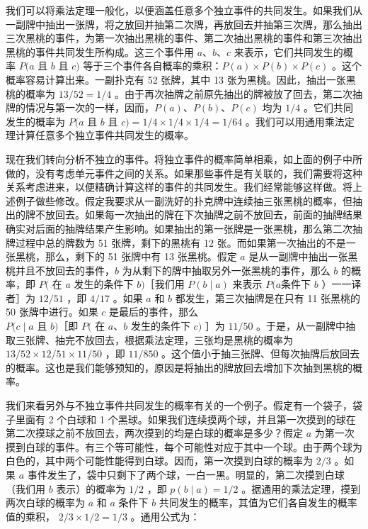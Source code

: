 我们可以将乘法定理一般化，以便涵盖任意多个独立事件的共同发生。如果我们从一副牌中抽出一张牌，将之放回并抽第二次牌，再放回去并抽第三次牌，那么抽出三次黑桃的事件，为第一次抽出黑桃的事件、第二次抽出黑桃的事件和第三次抽出黑桃的事件共同发生所构成。这三个事件用 $a 、 b 、 c$ 来表示，它们共同发生的概率 $P(a$ 且 $b$ 且 $c)$ 等于三个事件各自概率的乘积：$P(a) \times P(b) \times P(c)$ 。这个概率容易计算出来。一副扑克有 52 张牌，其中 13 张为黑桃。因此，抽出一张黑桃的概率为 $13 / 52=1 / 4$ 。由于再次抽牌之前原先抽出的牌被放了回去，第二次抽牌的情况与第一次的一样，因而，$P(a) 、 P(b) 、 P(c)$ 均为 $1 / 4$ 。它们共同发生的概率为 $P(a$ 且 $b$ 且 $c)=1 / 4 \times 1 / 4 \times 1 / 4=1 / 64$ 。我们可以用通用乘法定理计算任意多个独立事件共同发生的概率。

现在我们转向分析不独立的事件。将独立事件的概率简单相乘，如上面的例子中所做的，没有考虑单元事件之间的关系。如果那些事件是有关联的，我们需要将这种关系考虑进来，以便精确计算这样的事件的共同发生。我们经常能够这样做。将上述例子做些修改。假定我要求从一副洗好的扑克牌中连续抽三张黑桃的概率，但抽出的牌不放回去。如果每一次抽出的牌在下次抽牌之前不放回去，前面的抽牌结果确实对后面的抽牌结果产生影响。如果抽出的第一张牌是一张黑桃，那么第二次抽牌过程中总的牌数为 51 张牌，剩下的黑桃有 12 张。而如果第一次抽出的不是一张黑桃，那么，剩下的 51 张牌中有 13 张黑桃。假定 $a$ 是从一副牌中抽出一张黑桃并且不放回去的事件，$b$ 为从剩下的牌中抽取另外一张黑桃的事件，那么 $b$ 的概率，即 $P($ 在 $a$ 发生的条件下 $b)$［我们用 $P(b \mid a)$ 来表示 $P(a$条件下 $b$ ）一一译者］为 $12 / 51$ ，即 $4 / 17$ 。如果 $a$ 和 $b$ 都发生，第三次抽牌是在只有 11 张黑桃的 50 张牌中进行。如果 $c$ 是最后的事件，那么\\
$P(c \mid a$ 且 $b)$［即 $P($ 在 $a 、 b$ 发生的条件下 $c)$ ］为 $11 / 50$ 。于是，从一副牌中抽取三张牌、抽完不放回去，根据乘法定理，三张均是黑桃的概率为 $13 / 52 \times 12 / 51 \times 11 / 50$ ，即 $11 / 850$ 。这个值小于抽三张牌、但每次抽牌后放回去的概率。这也是我们能够预知的，原因是将抽出的牌放回去增加下次抽到黑桃的概率。

我们来看另外与不独立事件共同发生的概率有关的一个例子。假定有一个袋子，袋子里面有 2 个白球和 1 个黑球。如果我们连续摸两个球，并且第一次摸到的球在第二次摸球之前不放回去，两次摸到的均是白球的概率是多少？假定 $a$ 为第一次摸到白球的事件。有三个等可能性，每个可能性对应于其中一个球。由于两个球为白色的，其中两个可能性能得到白球。因而，第一次摸到白球的概率为 $2 / 3$ 。如果 $a$ 事件发生了，袋中只剩下了两个球，一白一黑。明显的，第二次摸到白球（我们用 $b$ 表示）的概率为 $1 / 2$ ，即 $p(b \mid a)=1 / 2$ 。据通用的乘法定理，摸到两次白球的概率为 $a$ 和 $a$ 条件下 $b$ 共同发生的概率，其值为它们各自发生的概率值的乘积， $2 / 3 \times 1 / 2=1 / 3$ 。通用公式为：

